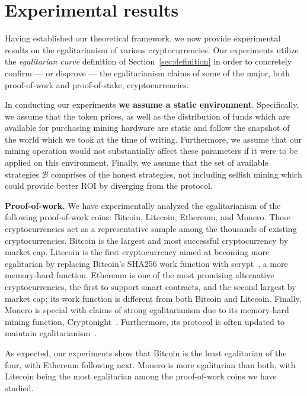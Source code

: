 \section{Experimental results}\label{sec:experiments}

Having established our theoretical framework, we now provide experimental
results on the egalitarianism of various cryptocurrencies. Our experiments
utilize the \emph{egalitarian curve} definition of Section~\ref{sec:definition}
in order to concretely confirm --- or disprove --- the egalitarianism claims of
some of the major, both proof-of-work and proof-of-stake, cryptocurrencies.

In conducting our experiments \textbf{we assume a static environment}.
Specifically, we assume that the token prices, as well as the distribution of
funds which are available for purchasing mining hardware are static and follow
the snapshot of the world which we took at the time of writing. Furthermore, we
assume that our mining operation would not substantially affect these
parameters if it were to be applied on this environment. Finally, we assume
that the set of available strategies $\mathcal{B}$ comprises of the honest
strategies, \eg not including selfish mining which could provide better ROI
by diverging from the protocol.

\noindent\textbf{Proof-of-work.}
\noindent
We have experimentally analyzed the egalitarianism of the following
proof-of-work coins: Bitcoin, Litecoin, Ethereum, and Monero. These
cryptocurrencies act as a representative sample among the thousands of existing
cryptocurrencies. Bitcoin is the largest and most successful cryptocurrency by
market cap. Litecoin is the first cryptocurrency aimed at becoming more
egalitarian by replacing Bitcoin's SHA256 work function with scrypt~\cite{percival2016scrypt}, a more
memory-hard function. Ethereum is one of the most promising alternative
cryptocurrencies, the first to support smart contracts, and the second largest
by market cap; its work function is different from both Bitcoin and Litecoin.
Finally, Monero is special with claims of strong egalitarianism due to its
memory-hard mining function, Cryptonight~\cite{van2013cryptonote}. Furthermore, its protocol is often
updated to maintain
egalitarianism~\cite{monero-hard-asic}.

As expected, our experiments show that Bitcoin is the least egalitarian of the
four, with Ethereum following next. Monero is more egalitarian than both, with
Litecoin being the most egalitarian among the proof-of-work coins
we have studied. 

